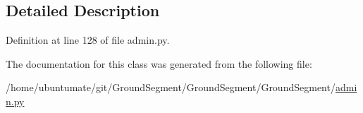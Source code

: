 \subsection{Detailed Description}


Definition at line 128 of file admin.\+py.



The documentation for this class was generated from the following file\+:\begin{DoxyCompactItemize}
\item 
/home/ubuntumate/git/\+Ground\+Segment/\+Ground\+Segment/\+Ground\+Segment/\hyperlink{admin_8py}{admin.\+py}\end{DoxyCompactItemize}
